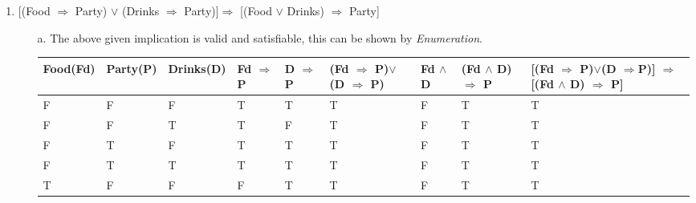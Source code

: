 \documentclass[11pt, a4paper]{report}
\begin{document}
\begin{enumerate}
\begin{itemize}
\end{itemize}

\item 
\begin{flushleft}

[(Food $\Rightarrow$ Party) $\vee$ (Drinks $\Rightarrow$ Party)]$ \Rightarrow$ [(Food $\vee$ Drinks) $ \Rightarrow$ Party]
\end{flushleft} 
\begin{itemize}
\item[a.] The above given implication is valid and satisfiable, this can be shown by \textit{Enumeration}. 


\begin{table}[h]
\centering
\begin{adjustbox}{width=\textwidth}

\begin{tabular}{|l|l|l|l|l|l|l|l|l|}
\hline
Food(Fd) & Party(P) & Drinks(D) & Fd $\Rightarrow$ P & D $\Rightarrow$ P & (Fd $\Rightarrow$ P)$\vee$(D $\Rightarrow$ P) & Fd $\wedge$ D & (Fd $\wedge$ D) $\Rightarrow$ P & [(Fd $\Rightarrow$ P)$\vee$(D $\Rightarrow$P)] $\Rightarrow$ [(Fd $\wedge$ D) $\Rightarrow$ P] \\ \hline
F        & F        & F         & T                  & T                 & T                                          & F             & T                             & T                                                                                        \\ \hline
F        & F        & T         & T                  & F                 & T                                          & F             & T                             & T                                                                                        \\ \hline
F        & T        & F         & T                  & T                 & T                                          & F             & T                             & T                                                                                        \\ \hline
F        & T        & T         & T                  & T                 & T                                          & F             & T                             & T                                                                                        \\ \hline
T        & F        & F         & F                  & T                 & T                                          & F             & T                             & T                                                                                        \\ \hline

\end{tabular}
\end{adjustbox}
\end{table}
\end{itemize}
\end{enumerate}
\end{document}
